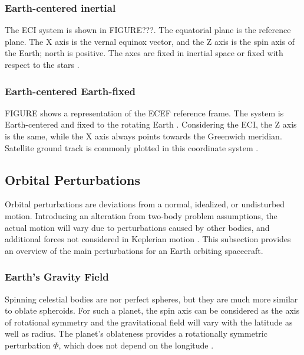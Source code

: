 \subsubsection{Earth-centered inertial}
The ECI system is shown in FIGURE???.
The equatorial plane is the reference plane.
The X axis is the vernal equinox vector, and the Z axis is the spin axis of the Earth; north is positive.
The axes are fixed in inertial space or fixed with respect to the stars \cite{brown1998spacecraft}.

\subsubsection{Earth-centered Earth-fixed}
FIGURE shows a representation of the ECEF reference frame.
The system is Earth-centered and fixed to the rotating Earth \cite{vallado2013fundamentals}.
Considering the ECI, the Z axis is the same, while the X axis always points towards the Greenwich meridian.
Satellite ground track is commonly plotted in this coordinate system \cite{brown1998spacecraft}.

\subsection{Orbital Perturbations} \label{perturbations}
Orbital perturbations are deviations from a normal, idealized, or undisturbed motion.
Introducing an alteration from two-body problem assumptions, the actual motion will vary due to perturbations caused by other bodies, and additional forces not considered in Keplerian motion \cite{vallado2013fundamentals}.
This subsection provides an overview of the main perturbations for an Earth orbiting spacecraft.

\subsubsection{Earth's Gravity Field}
Spinning celestial bodies are nor perfect spheres, but they are much more similar to oblate spheroids.
For such a planet, the spin axis can be considered as the axis of rotational symmetry and the gravitational field will vary with the latitude as well as radius.
The planet's oblateness provides a rotationally symmetric perturbation $\Phi$, which does not depend on the longitude \cite{curtis2020orbital}.


